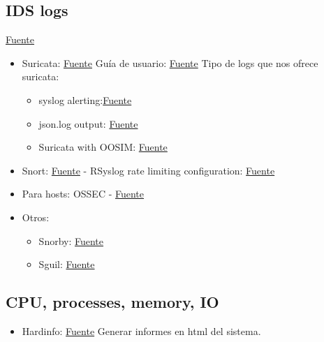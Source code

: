 \documentclass[a4paper,12pt]{article}
\begin{document}
\subsection{IDS logs}
\href{https://www.alienvault.com/blogs/security-essentials/open-source-intrusion-detection-tools-a-quick-overview}{Fuente}
\begin{itemize}
\item Suricata: \href{http://suricata-ids.org/}{Fuente} Guía de usuario: \href{https://redmine.openinfosecfoundation.org/projects/suricata/wiki/Suricata_User_Guide}{Fuente} Tipo de logs que nos ofrece suricata:
  \begin{itemize}
  \item syslog alerting:\href{https://redmine.openinfosecfoundation.org/projects/suricata/wiki/Syslog_Alerting_Compatibility}{Fuente}
  \item json.log output: \href{https://redmine.openinfosecfoundation.org/projects/suricata/wiki/What_to_do_with_files-jsonlog_output}{Fuente}
  \item Suricata with OOSIM: \href{https://redmine.openinfosecfoundation.org/projects/suricata/wiki/Suricata_with_OSSIM}{Fuente}
  \end{itemize}
\item Snort: \href{https://www.snort.org/}{Fuente} - RSyslog rate limiting configuration: \href{https://s3.amazonaws.com/snort-org-site/production/document_files/files/000/000/025/original/snort-rate-limiting-rev1.pdf?AWSAccessKeyId=AKIAIXACIED2SPMSC7GA&Expires=1433101726&Signature=wnGRl\%2FEmKc\%2BftdA6um3VT2O99R4\%3D}{Fuente}
\item Para hosts: OSSEC - \href{http://www.ossec.net/}{Fuente}
\item Otros:
  \begin{itemize}
  \item Snorby: \href{https://snorby.org/}{Fuente}
  \item Sguil: \href{http://bammv.github.io/sguil/index.html}{Fuente}
  \end{itemize}
\end{itemize}

\subsection{CPU, processes, memory, IO}

\begin{itemize}
\item Hardinfo: \href{https://github.com/lpereira/hardinfo}{Fuente} Generar informes en html del sistema.
\end{itemize}
\end{document}
